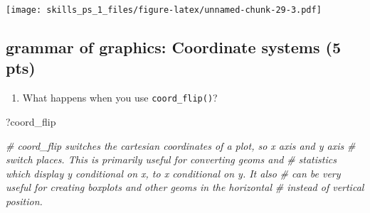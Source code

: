 \documentclass[
]{article}
\newenvironment{Shaded}{\begin{snugshade}}{\end{snugshade}}
\newcommand{\CommentTok}[1]{\textcolor[rgb]{0.56,0.35,0.01}{\textit{#1}}}
\newcommand{\NormalTok}[1]{#1}
\providecommand{\tightlist}{%
  \setlength{\itemsep}{0pt}\setlength{\parskip}{0pt}}
\begin{document}
\begin{enumerate}
  \texttt{[image: skills\_ps\_1\_files/figure-latex/unnamed-chunk-29-3.pdf]}
\end{enumerate}

\hypertarget{grammar-of-graphics-coordinate-systems-5-pts}{%
\subsection{grammar of graphics: Coordinate systems (5
pts)}\label{grammar-of-graphics-coordinate-systems-5-pts}}

\begin{enumerate}
\def\labelenumi{\arabic{enumi}.}
\tightlist
\item
  What happens when you use \texttt{coord\_flip()}?
\end{enumerate}

\begin{Shaded}
\begin{Highlighting}[]
\NormalTok{?coord_flip}

\CommentTok{# coord_flip switches the cartesian coordinates of a plot, so x axis and y axis}
\CommentTok{# switch places. This is primarily useful for converting geoms and}
\CommentTok{# statistics which display y conditional on x, to x conditional on y. It also}
\CommentTok{# can be very useful for creating boxplots and other geoms in the horizontal}
\CommentTok{# instead of vertical position.}
\end{Highlighting}
\end{Shaded}
\end{document}

